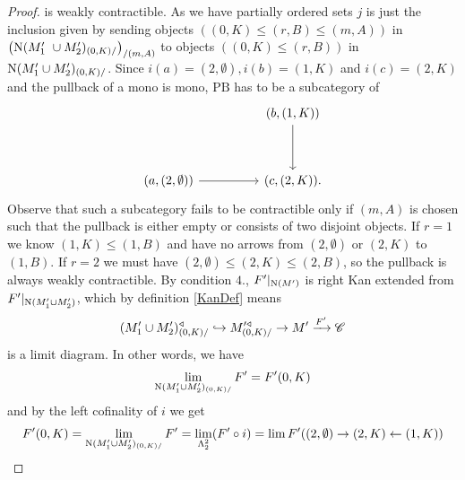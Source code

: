 \documentclass[../../thesis.tex]{subfiles}
\begin{document}
\begin{proof}
    is weakly contractible.
    As we have partially ordered sets
    $j$ is just the inclusion given by sending objects $((0,K) \leq (r, B) \leq (m,A))$ in $\left(\Nerve(M_1' \cup M_2')_{(0,K)/}\right)_{/(m,A)}$ to objects $((0,K) \leq (r,B))$ in ${\mathrm{N}(M_1'\cup M_2')_{(0,K)/}}$.
    Since $i(a)=(2,\emptyset), i(b)=(1,K)$ and $i(c)=(2,K)$ and the pullback of a mono is mono, $\mathrm{PB}$ has to be a subcategory of
    \[\begin{tikzcd}
            && {(b,(1,K))} \\
            \\
            {(a,(2,\emptyset))} && {(c,(2,K))}
            \arrow[from=3-1, to=3-3]
            \arrow[from=1-3, to=3-3].
        \end{tikzcd}\]
    Observe that such a subcategory fails to be contractible only if $(m,A)$ is chosen such that the pullback is either empty or consists of two disjoint objects.
    If $r=1$ we know $(1,K) \leq (1,B)$ and have no arrows from $(2,\emptyset)$ or $(2,K)$ to $(1,B)$.
    If $r=2$ we must have $(2,\emptyset) \leq (2,K) \leq (2,B)$, so the pullback is always weakly contractible.
    By condition $4.$, $F'|_{\mathrm{N}(M')}$ is right Kan extended from $F'|_{\mathrm{N}(M_1' \cup M_2')}$, which by definition \ref{KanDef} means
    \[
        (M_1' \cup M_2')^{\triangleleft}_{(0,K)/} \hookrightarrow M'^{\triangleleft}_{(0,K)/}\rightarrow M' \xrightarrow{F'} \mathscr{C}
    \]
    is a limit diagram.
    In other words, we have
    \[
        \lim_{\mathrm{N}(M_1' \cup M_2')_{(0,K)/}}F' = F'(0,K)
    \]
    and by the left cofinality of $i$ we get
    \[
        F'(0,K) = \lim_{\mathrm{N}(M_1' \cup M_2')_{(0,K)/}}F' = \lim_{\Lambda_2^2}(F'\circ i) = \lim F'((2,\emptyset) \rightarrow (2,K) \leftarrow (1,K))
    \]


\end{proof}
\end{document}
